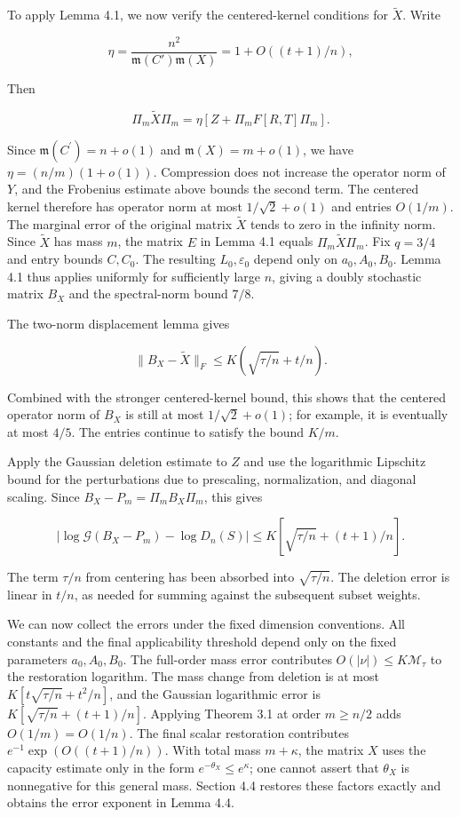 \documentclass[11pt,a4paper]{article}
\begin{document}
To apply Lemma 4.1, we now verify the centered-kernel conditions for \(\widetilde X\). Write

\[
\eta=\frac{n^2}{\mathfrak m(C')\mathfrak m(X)}=1+O((t+1)/n),
\]

Then

\[
\Pi_m\widetilde X\Pi_m=\eta\left[Z+\Pi_mF[R,T]\Pi_m\right].
\]

Since \(\mathfrak m(C^{\prime})=n+o(1)\) and \(\mathfrak m(X)=m+o(1)\), we have \(\eta=(n/m)(1+o(1))\). Compression does not increase the operator norm of \(Y\), and the Frobenius estimate above bounds the second term. The centered kernel therefore has operator norm at most \(1/\sqrt2+o(1)\) and entries \(O(1/m)\). The marginal error of the original matrix \(\widetilde X\) tends to zero in the infinity norm. Since \(\widetilde X\) has mass \(m\), the matrix \(E\) in Lemma 4.1 equals \(\Pi_m\widetilde X\Pi_m\). Fix \(q=3/4\) and entry bounds \(C,C_0\). The resulting \(L_0,\varepsilon_0\) depend only on \(a_0,A_0,B_0\). Lemma 4.1 thus applies uniformly for sufficiently large \(n\), giving a doubly stochastic matrix \(B_X\) and the spectral-norm bound \(7/8\).

The two-norm displacement lemma gives

\[
\|B_X-\widetilde X\|_F\le K(\sqrt{\tau/n}+t/n).
\]

Combined with the stronger centered-kernel bound, this shows that the centered operator norm of \(B_X\) is still at most \(1/\sqrt2+o(1)\); for example, it is eventually at most \(4/5\). The entries continue to satisfy the bound \(K/m\).

Apply the Gaussian deletion estimate to \(Z\) and use the logarithmic Lipschitz bound for the perturbations due to prescaling, normalization, and diagonal scaling. Since \(B_X-P_m=\Pi_mB_X\Pi_m\), this gives

\[
|\log\mathcal G(B_X-P_m)-\log D_n(S)|\le K\left[\sqrt{\tau/n}+(t+1)/n\right].
\]

The term \(\tau/n\) from centering has been absorbed into \(\sqrt{\tau/n}\). The deletion error is linear in \(t/n\), as needed for summing against the subsequent subset weights.

We can now collect the errors under the fixed dimension conventions. All constants and the final applicability threshold depend only on the fixed parameters \(a_0,A_0,B_0\). The full-order mass error contributes \(O(|\nu|)\le K\mathcal M_\tau\) to the restoration logarithm. The mass change from deletion is at most \(K[t\sqrt{\tau/n}+t^2/n]\), and the Gaussian logarithmic error is \(K[\sqrt{\tau/n}+(t+1)/n]\). Applying Theorem 3.1 at order \(m\ge n/2\) adds \(O(1/m)=O(1/n)\). The final scalar restoration contributes \(e^{-1}\exp(O((t+1)/n))\). With total mass \(m+\kappa\), the matrix \(X\) uses the capacity estimate only in the form \(e^{-\theta_X}\le e^\kappa\); one cannot assert that \(\theta_X\) is nonnegative for this general mass. Section 4.4 restores these factors exactly and obtains the error exponent in Lemma 4.4.
\end{document}
